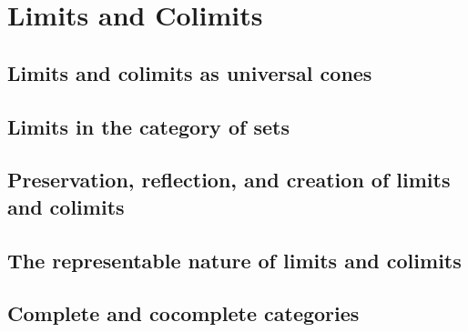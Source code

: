 \documentclass[main.tex]{subfiles}
\begin{document}
\chapter{Limits and Colimits}
\section{Limits and colimits as universal cones}














\pagebreak
\section{Limits in the category of sets}







\pagebreak
\section{Preservation, reflection, and creation of limits and colimits}







\pagebreak
\section{The representable nature of limits and colimits}





\pagebreak
\section{Complete and cocomplete categories}







\end{document}
